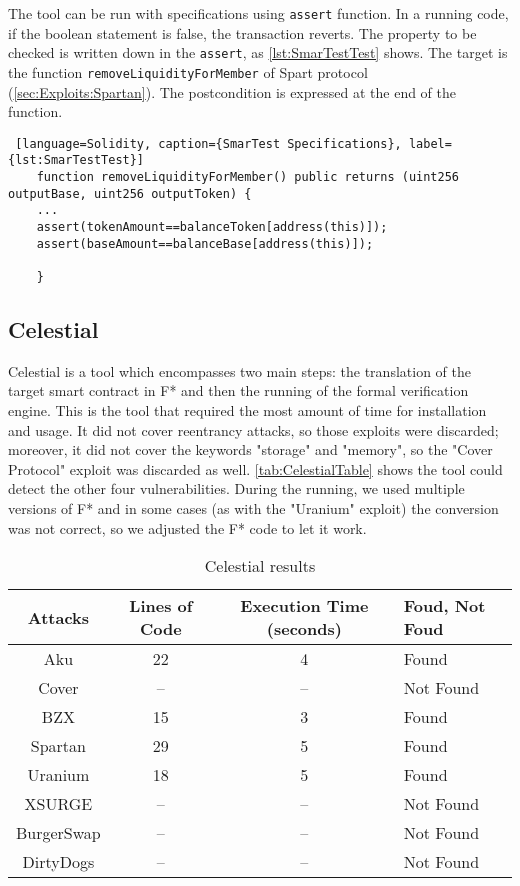 The tool can be run with specifications using \texttt{assert} function.
In a running code, if the boolean statement is false, the transaction reverts.
The property to be checked is written down in the \texttt{assert}, as \autoref*{lst:SmarTestTest} shows.
The target is the function \texttt{removeLiquidityForMember} of Spart protocol (\autoref*{sec:Exploits:Spartan}).
The postcondition is expressed at the end of the function.

\begin{lstlisting} [language=Solidity, caption={SmarTest Specifications}, label={lst:SmarTestTest}]
    function removeLiquidityForMember() public returns (uint256 outputBase, uint256 outputToken) {
    ...    
    assert(tokenAmount==balanceToken[address(this)]);
    assert(baseAmount==balanceBase[address(this)]);

    }
\end{lstlisting} 

\subsection*{Celestial} 
Celestial is a tool which encompasses two main steps: the translation of the target smart contract in F* and then the running of the formal verification engine.
This is the tool that required the most amount of time for installation and usage.
It did not cover reentrancy attacks, so those exploits were discarded; moreover, it did not cover the keywords "storage" and "memory",
so the "Cover Protocol" exploit was discarded as well. \autoref{tab:CelestialTable} shows the tool could detect the other four vulnerabilities.
During the running, we used multiple versions of F* and in some cases (as with the "Uranium" exploit) the conversion was not correct, so we adjusted the F* code to let it work. 
\begin{center}
    \begin{table*}
        \caption{Celestial results}
            \label{tab:CelestialTable}
                \begin{tabular}{cccl}
                \toprule
                    Attacks & Lines of Code & Execution Time (seconds) & Foud, Not Foud\\
                    \midrule
                    Aku & 22 & 4 & Found\\ 
                    Cover & --  & -- & Not Found \\ 
                    BZX & 15 & 3 & Found\\ 
                    Spartan & 29 &  5 & Found \\ 
                    Uranium & 18 &  5 & Found \\ 
                    XSURGE &  -- & -- & Not Found \\  
                    BurgerSwap &  -- & -- & Not Found\\ 
                    DirtyDogs &  -- & -- & Not Found \\
                \bottomrule
                \end{tabular}
    \end{table*}
        
\end{center}

